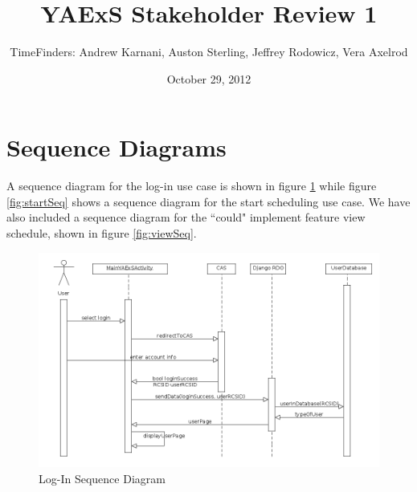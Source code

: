 \documentclass[11pt]{article}
\title{\bf YAExS Stakeholder Review 1}
\author{TimeFinders: Andrew Karnani, Auston Sterling, Jeffrey Rodowicz, Vera Axelrod}
\date{October 29, 2012}
\begin{document}
\maketitle


\section*{Sequence Diagrams} %

A sequence diagram for the log-in use case is shown in figure \ref{fig:logInSeq}
 while figure \ref{fig:startSeq} shows a sequence diagram for the start scheduling 
use case.  We have also included a sequence diagram for the ``could" implement feature view schedule, shown in figure \ref{fig:viewSeq}. 

\begin{figure}
	\centering
		\includegraphics[width = \textwidth]{logInSequence.png}
	\caption{Log-In Sequence Diagram}
	\label{fig:logInSeq}
\end{figure}
\end{document}
